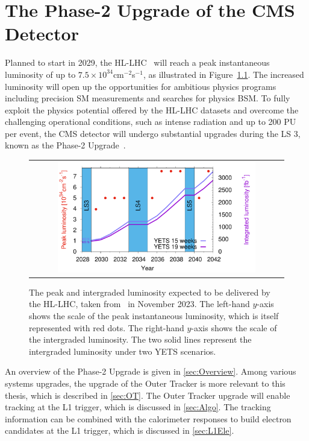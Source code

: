 \chapter{The Phase-2 Upgrade of the CMS Detector}
\label{chap:Upgrade}

Planned to start in 2029, the \ac{HL-LHC}~\cite{Apollinari:2017lan} will reach a peak instantaneous luminosity of up to $7.5\times10^{34}$cm$^{-2}$s$^{-1}$, as illustrated in Figure~\ref{fig:Lumi}. The increased luminosity will open up the opportunities for ambitious physics programs including precision \ac{SM} measurements and searches for physics \ac{BSM}. To fully exploit the physics potential offered by the \ac{HL-LHC} datasets and overcome the challenging operational conditions, such as intense radiation and up to 200 \ac{PU} per event, the \ac{CMS} detector will undergo substantial upgrades during the \ac{LS} 3, known as the Phase-2 Upgrade~\cite{Contardo:2015bmq}.  

\begin{figure}[tbh!]
 \begin{center}
 \begin{tabular}{c}
 \includegraphics[width=0.8\textwidth]{figures/Part2/Upgrade/Lumi}
 \end{tabular}
 \caption{The peak and intergraded luminosity expected to be delivered by the \ac{HL-LHC}, taken from~\cite{LHC:plan} in November 2023. The left-hand $y$-axis shows the scale of the peak instantaneous luminosity, which is itself represented with red dots. The right-hand $y$-axis shows the scale of the intergraded luminosity. The two solid lines represent the intergraded luminosity under two \ac{YETS} scenarios.}
 \label{fig:Lumi}
 \end{center}
\end{figure}

An overview of the Phase-2 Upgrade is given in \autoref{sec:Overview}. Among various systems upgrades, the upgrade of the Outer Tracker is more relevant to this thesis, which is described in \autoref{sec:OT}. The Outer Tracker upgrade will enable tracking at the \ac{L1} trigger, which is discussed in \autoref{sec:Algo}. The tracking information can be combined with the calorimeter responses to build electron candidates at the \ac{L1} trigger, which is discussed in \autoref{sec:L1Ele}.

